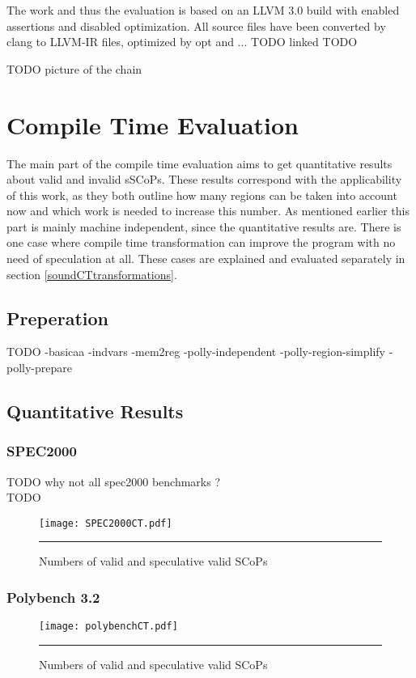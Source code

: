 \begin{shaded}
The work and thus the evaluation is based on an LLVM 3.0 build 
with enabled assertions and disabled optimization. All source files have been 
converted by clang to LLVM-IR files, optimized by opt and ... TODO linked TODO

\begin{center}TODO picture of the chain\end{center}


\section{Compile Time Evaluation}
The main part of the compile time evaluation aims to get quantitative results 
about valid and invalid sSCoPs. These results correspond with the applicability 
of this work, as they both outline how many regions can be taken into account now
and which work is needed to increase this number. 
As mentioned earlier this part is mainly machine independent, since the quantitative
results are. There is one case where compile time transformation can improve the
program with no need of speculation at all. 
These cases are explained and evaluated separately in section 
\ref{soundCTtransformations}.


\subsection{Preperation}
TODO
 -basicaa -indvars -mem2reg -polly-independent -polly-region-simplify -polly-prepare 


\subsection{Quantitative Results}

\subsubsection{SPEC2000}
TODO why not all spec2000 benchmarks ? \\
TODO 

\end{shaded}


\begin{figure}[htbp]
	\centering
        \texttt{[image: SPEC2000CT.pdf]}
		\rule{35em}{0.5pt}
	\caption{Numbers of valid and speculative valid SCoPs}
	\label{fig:SPEC2000CT}
\end{figure}

\subsubsection{Polybench 3.2}
\begin{figure}[htbp]
	\centering
        \texttt{[image: polybenchCT.pdf]}
		\rule{35em}{0.5pt}
	\caption{Numbers of valid and speculative valid SCoPs}
	\label{fig:polybenchCT}
\end{figure}

